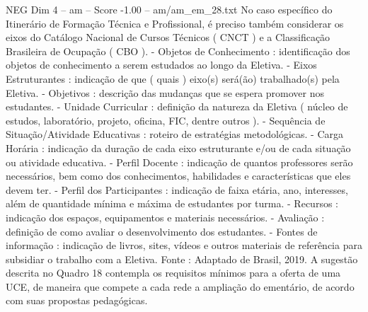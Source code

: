 \begin{textsample}{NEG Dim 4 – am – Score -1.00 – am/am\_em\_28.txt}
No caso específico do Itinerário de Formação Técnica e Profissional, é preciso também considerar os eixos do Catálogo Nacional de Cursos Técnicos ( CNCT ) e a Classificação Brasileira de Ocupação ( CBO ). - Objetos de Conhecimento : identificação dos objetos de conhecimento a serem estudados ao longo da Eletiva. - Eixos Estruturantes : indicação de que ( quais ) eixo(s) será(ão) trabalhado(s) pela Eletiva. - Objetivos : descrição das mudanças que se espera promover nos estudantes. - Unidade Curricular : definição da natureza da Eletiva ( núcleo de estudos, laboratório, projeto, oficina, FIC, dentre outros ). - Sequência de Situação/Atividade Educativas : roteiro de estratégias metodológicas. - Carga Horária : indicação da duração de cada eixo estruturante e/ou de cada situação ou atividade educativa. - Perfil Docente : indicação de quantos professores serão necessários, bem como dos conhecimentos, habilidades e características que eles devem ter. - Perfil dos Participantes : indicação de faixa etária, ano, interesses, além de quantidade mínima e máxima de estudantes por turma. - Recursos : indicação dos espaços, equipamentos e materiais necessários. - Avaliação : definição de como avaliar o desenvolvimento dos estudantes. - Fontes de informação : indicação de livros, sites, vídeos e outros materiais de referência para subsidiar o trabalho com a Eletiva.
Fonte : Adaptado de Brasil, 2019.
A sugestão descrita no Quadro 18 contempla os requisitos mínimos para a oferta de uma UCE, de maneira que compete a cada rede a ampliação do ementário, de acordo com suas propostas pedagógicas.

\end{textsample}
